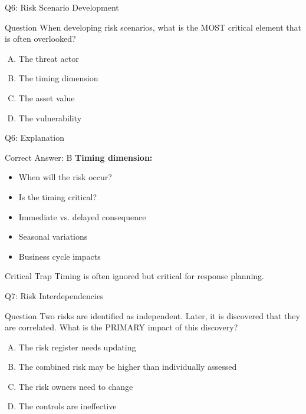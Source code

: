 \documentclass{beamer}
\begin{document}
			\begin{frame}{Q6: Risk Scenario Development}
				\begin{block}{Question}
					When developing risk scenarios, what is the MOST critical element that is often overlooked?
				\end{block}
				\begin{enumerate}[(A)]
					\item The threat actor
					\item The timing dimension
					\item The asset value
					\item The vulnerability
				\end{enumerate}
			\end{frame}
			
			\begin{frame}{Q6: Explanation}
				\begin{block}{Correct Answer: B}
					\textbf{Timing dimension:}
					\begin{itemize}
						\item When will the risk occur?
						\item Is the timing critical?
						\item Immediate vs. delayed consequence
						\item Seasonal variations
						\item Business cycle impacts
					\end{itemize}
				\end{block}
				\begin{alertblock}{Critical Trap}
					Timing is often ignored but critical for response planning.
				\end{alertblock}
			\end{frame}
			
			\begin{frame}{Q7: Risk Interdependencies}
				\begin{block}{Question}
					Two risks are identified as independent. Later, it is discovered that they are correlated. What is the PRIMARY impact of this discovery?
				\end{block}
				\begin{enumerate}[(A)]
					\item The risk register needs updating
					\item The combined risk may be higher than individually assessed
					\item The risk owners need to change
					\item The controls are ineffective
				\end{enumerate}
			\end{frame}
			
\end{document}
